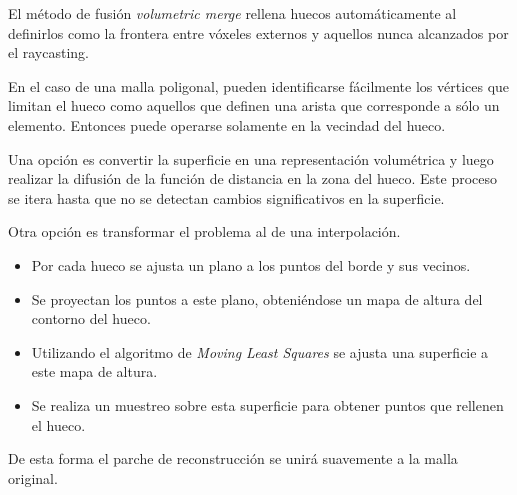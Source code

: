 		El método de fusión \emph{volumetric merge} rellena huecos
		automáticamente al definirlos como la frontera entre vóxeles externos y
		aquellos nunca alcanzados por el raycasting.

		En el caso de una malla poligonal,
		pueden identificarse fácilmente los vértices que limitan el hueco
		como aquellos que definen una arista que corresponde a sólo un elemento.
		Entonces puede operarse solamente en la vecindad del hueco.

		Una opción es convertir la superficie en una
		representación volumétrica y luego realizar la difusión de la función
		de distancia en la zona del hueco.
		Este proceso se itera hasta que no se detectan cambios significativos en la superficie.\cite{fillingholes}

		Otra opción es transformar el problema al de una interpolación.
		\begin{itemize}
			\item Por cada hueco se ajusta un plano a los puntos del borde y
				sus vecinos.
			\item Se proyectan los puntos a este plano, obteniéndose un mapa de
				altura del contorno del hueco.
			\item Utilizando el algoritmo de \emph{Moving Least Squares} se
				ajusta una superficie a este mapa de altura.
			\item Se realiza un muestreo sobre esta superficie para obtener
				puntos que rellenen el hueco.
		\end{itemize}
		De esta forma el parche de reconstrucción se unirá suavemente a la malla original.\cite{Filling_holes_on_locally_smooth_surfaces}


